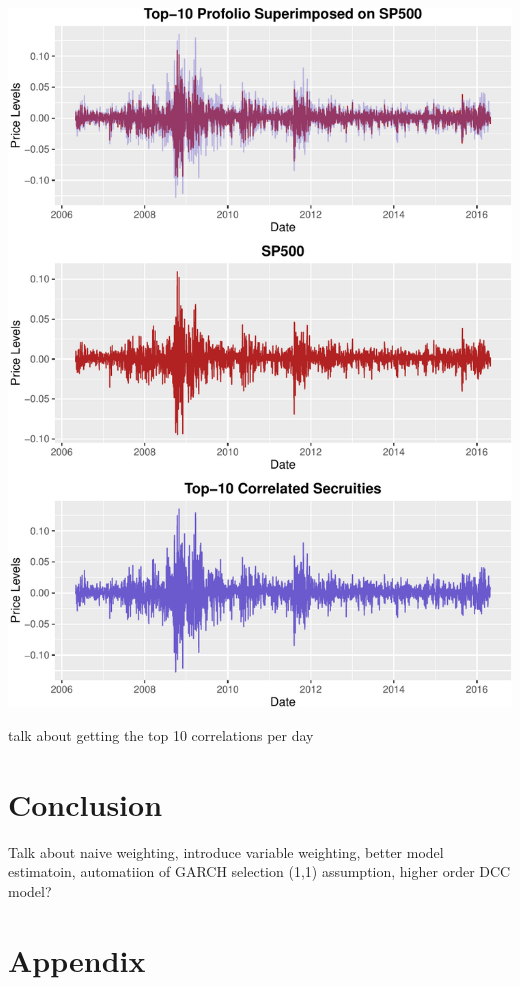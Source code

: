 \documentclass[]{elsarticle} %
\makeatletter
\def\maxwidth{\ifdim\Gin@nat@width>\linewidth\linewidth
\else\Gin@nat@width\fi}
\let\Oldincludegraphics\includegraphics
\renewcommand{\includegraphics}[1]{\Oldincludegraphics[width=\maxwidth]{#1}}
\makeatother
\begin{document}
\includegraphics{report_files/figure-latex/analysis23223d011-1.pdf}

talk about getting the top 10 correlations per day

\section{Conclusion}\label{conclusion}

Talk about naive weighting, introduce variable weighting, better model
estimatoin, automatiion of GARCH selection (1,1) assumption, higher
order DCC model?

\section{Appendix}\label{appendix}
\end{document}
